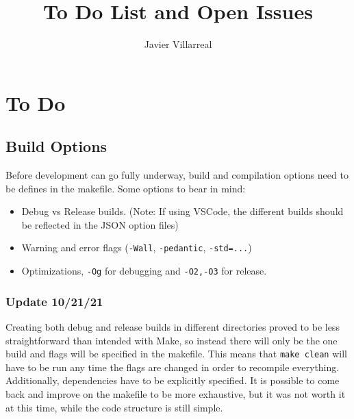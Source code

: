 \documentclass[12pt]{article}
\begin{document}
    \title{To Do List and Open Issues}
    \author{Javier Villarreal}
    \date{}
    \maketitle

    \section*{To Do}

    \subsection*{Build Options}
    Before development can go fully underway, build and compilation options need to be defines in the makefile. Some options to bear in mind:
    \begin{itemize}
        \item Debug vs Release builds. (Note: If using VSCode, the different builds should be reflected in the JSON option files)
        \item Warning and error flags (\texttt{-Wall}, \texttt{-pedantic}, \texttt{-std=...})
        \item Optimizations, \texttt{-Og} for debugging and \texttt{-O2,-O3} for release.
    \end{itemize}

        \subsubsection*{Update 10/21/21}
        Creating both debug and release builds in different directories proved to be less straightforward than intended with Make, so instead there will only be the one build and flags will be specified in the makefile. This means that \texttt{make clean} will have to be run any time the flags are changed in order to recompile everything. Additionally, dependencies have to be explicitly specified. It is possible to come back and improve on the makefile to be more exhaustive, but it was not worth it at this time, while the code structure is still simple.
\end{document}
